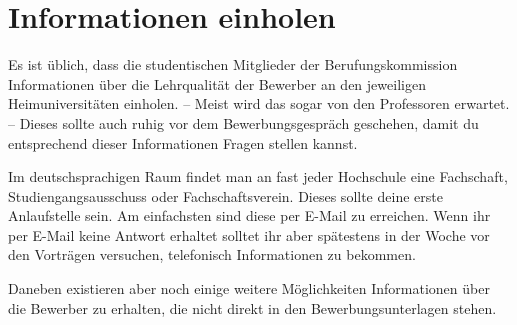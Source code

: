 \section{Informationen einholen}
Es ist üblich, dass die studentischen Mitglieder der Berufungskommission Informationen über die Lehrqualität der Bewerber an den jeweiligen Heimuniversitäten einholen. -- Meist wird das sogar von den Professoren erwartet. -- Dieses sollte auch ruhig vor dem Bewerbungsgespräch geschehen, damit du entsprechend dieser Informationen Fragen stellen kannst.

Im deutschsprachigen Raum findet man an fast jeder Hochschule eine Fachschaft, Studiengangsausschuss oder Fachschaftsverein. Dieses sollte deine erste Anlaufstelle sein. Am einfachsten sind diese per E-Mail zu erreichen.  Wenn ihr per E-Mail keine Antwort erhaltet solltet ihr aber spätestens in der Woche vor den Vorträgen versuchen, telefonisch Informationen zu bekommen.

Daneben existieren aber noch einige weitere Möglichkeiten Informationen über die Bewerber zu erhalten, die nicht direkt in den Bewerbungsunterlagen stehen.

